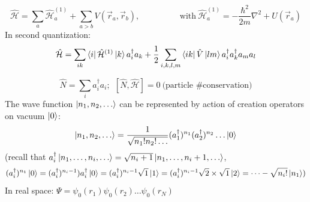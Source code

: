 \documentclass[10pt]{article}
\newcommand{\smallspace}{\hspace{2cm}}
\begin{document}
\begin{tcolorbox}[colframe = red, colback = white]
    $$
        \hat {\mathcal H} = \sum_a \hat {\mathcal H}_a^{(1)} + \sum_{a > b} V(\vec r_a, \vec r_b), \smallspace \text{with} \ \hat{\mathcal{H}}_a^{(1)} = -\frac{\hbar^2}{2m}\nabla^2 + U(\vec r_a)
    $$
    In second quantization:
    $$
    \hat{\mathcal{H}} = \sum_{ik}\bra{i}\hat{\mathcal{H}}^{(1)}\ket{k}a_i^\dagger a_k + \frac{1}{2} \sum_{i,k,l,m}\bra{ik}\hat V \ket{lm} a_i^\dagger a_k^\dagger a_m a_l
    $$
\end{tcolorbox}
$$
\hat N = \sum_i a_i^\dagger a_i; \ \ [\hat N, \hat{\mathcal{H}}] = 0 \ \text{(particle \# conservation)}
$$
The wave function $\ket{n_1, n_2,\dots}$ can be represented by action of creation operators on vacuum $\ket{0}$:
$$
\ket{n_1, n_2, \dots} = \frac{1}{\sqrt{n_1!n_2!\dots}}(a_1^\dagger)^{n_1}(a_2^\dagger)^{n_2}\dots \ket{0}
$$
(recall that $a_i^\dagger \ket{n_1, \dots , n_i,\dots} = \sqrt{n_i +1}\ket{n_1,\dots,n_i+1,\dots}$, 
$$
(a_i^\dagger)^{n_1} \ket{0} = (a_i^\dagger)^{n_i-1})a_i^\dagger \ket{0} = (a_i^\dagger)^{n_i-1}\sqrt{1}\ket{1} = (a_i^\dagger)^{n_i-1}\sqrt{2}\times \sqrt{1}\ket{2} = \dots - \sqrt{n_i!} \ket{n_1})
$$
In real space: $\Psi = \psi_0(r_1)\psi_0(r_2)\dots \psi_0(r_N)$
\end{document}

